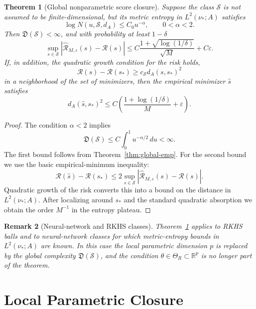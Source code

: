 \documentclass{article}
\newtheorem{theorem}{Theorem}[section]
\newtheorem{remark}[theorem]{Remark}
\begin{document}
\begin{theorem}[Global nonparametric score closure]
\label{thm:nonparametric-score-closure}
Suppose the class \(\mathcal S\) is not assumed to be finite-dimensional, but its
metric entropy in \(L^2(\nu_*;A)\) satisfies
\[
        \log N(u,\mathcal S,d_A)\le C_0u^{-\alpha},
        \qquad 0<\alpha<2.
\]
Then \(\mathfrak D(\mathcal S)<\infty\), and with probability at least
\(1-\delta\)
\[
        \sup_{s\in\mathcal S}
        |\widehat{\mathcal R}_{M,\varepsilon}(s)-\mathcal R(s)|
        \le
        C
        \frac{1+\sqrt{\log(1/\delta)}}{\sqrt M}
        +C\varepsilon .
\]
If, in addition, the quadratic growth condition for the risk holds,
\[
        \mathcal R(s)-\mathcal R(s_*)
        \ge
        c_{\mathcal S} d_A(s,s_*)^2
\]
in a neighborhood of the set of minimizers, then the empirical minimizer
\(\widehat s\) satisfies
\[
        d_A(\widehat s,s_*)^2
        \le
        C
        \left(
        \frac{1+\log(1/\delta)}{M}
        +\varepsilon
        \right).
\]
\end{theorem}

\begin{proof}
The condition \(\alpha<2\) implies
\[
        \mathfrak D(\mathcal S)
        \le
        C\int_0^1 u^{-\alpha/2}\,du<\infty .
\]
The first bound follows from Theorem~\ref{thm:global-emp}. For the second bound
we use the basic empirical-minimum inequality:
\[
        \mathcal R(\widehat s)-\mathcal R(s_*)
        \le
        2\sup_{s\in\mathcal S}
        |\widehat{\mathcal R}_{M,\varepsilon}(s)-\mathcal R(s)|.
\]
Quadratic growth of the risk converts this into a bound on the distance in
\(L^2(\nu_*;A)\). After localizing around \(s_*\) and the standard quadratic
absorption we obtain the order \(M^{-1}\) in the entropy plateau.
\end{proof}

\begin{remark}[Neural-network and RKHS classes]
Theorem~\ref{thm:nonparametric-score-closure} applies to RKHS balls and to
neural-network classes for which metric-entropy bounds in \(L^2(\nu_*;A)\) are
known. In this case the local parametric dimension \(p\) is replaced by the
global complexity \(\mathfrak D(\mathcal S)\), and the condition
\(\theta\in\Theta_R\subset\mathbb R^p\) is no longer part of the theorem.
\end{remark}


\section{Local Parametric Closure}
\end{document}
